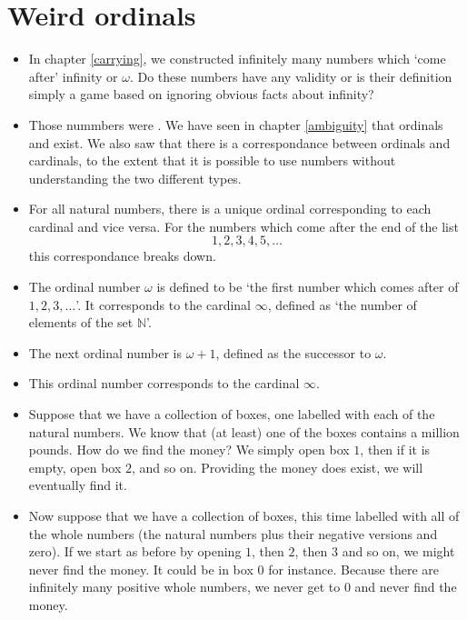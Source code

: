 \chapter{Weird ordinals}
\label{weird}

\begin{itemize}
\item
In chapter \ref{carrying}, we constructed infinitely many numbers which `come after' infinity or $\omega$. Do these numbers have any validity or is their definition simply a game based on ignoring obvious facts about infinity?
\item
Those nummbers were . We have seen in chapter \ref{ambiguity} that ordinals and  exist. We also saw that there is a correspondance between ordinals and cardinals, to the extent that it is possible to use numbers without understanding the two different types.
\item
For all natural numbers, there is a unique ordinal corresponding to each cardinal and vice versa. For the numbers which come after the end of the list 
\[ 1, 2, 3, 4, 5, \ldots \]
this correspondance breaks down.  
\item
The ordinal number $\omega$ is defined to be `the first number which comes after  of $1,2,3,\ldots$'. It corresponds to the cardinal $\infty$, defined as `the number of elements of the set $\mathbb{N}$'.
\item
The next ordinal number is $\omega + 1$, defined as the successor to $\omega$.
\item
This ordinal number  corresponds to the cardinal $\infty$.

\item
Suppose that we have a collection of boxes, one labelled with each of the natural numbers. We know that (at least) one of the boxes contains a million pounds. How do we find the money? We simply open box $1$, then if it is empty, open box $2$, and so on. Providing the money does exist, we will eventually find it.
\item
Now suppose that we have a collection of boxes, this time labelled with all of the whole numbers (the natural numbers plus their negative versions and zero). If we start as before by opening $1$, then $2$, then $3$ and so on, we might never find the money. It could be in box $0$ for instance. Because there are infinitely many positive whole numbers, we never get to $0$ and never find the money. 
\end{itemize} 
